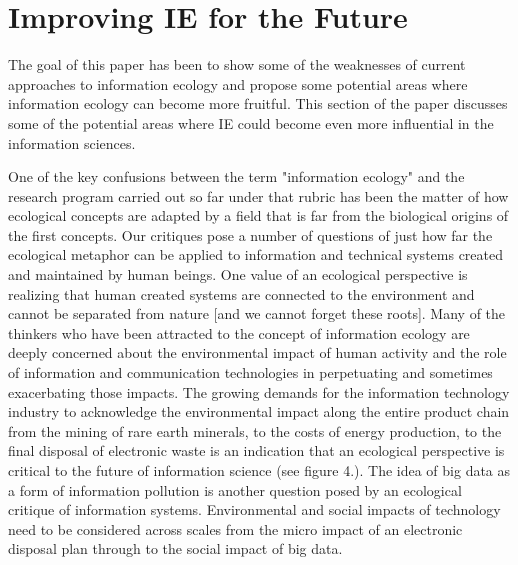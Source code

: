 \section{Improving IE for the Future}

The goal of this paper has been to show some of the weaknesses of current approaches to information ecology and propose some potential areas where information ecology can become more fruitful. This section of the paper discusses some of the potential areas where IE could become even more influential in the information sciences.

One of the key confusions between the term "information ecology" and the research program carried out so far under that rubric has been the matter of how ecological concepts are adapted by a field that is far from the biological origins of the first concepts. Our critiques pose a number of questions of just how far the ecological metaphor can be applied to information and technical systems created and maintained by human beings. One value of an ecological perspective is realizing that human created systems are connected to the environment and cannot be separated from nature [and we cannot forget these roots]. Many of the thinkers who have been attracted to the concept of information ecology are deeply concerned about the environmental impact of human activity and the role of information and communication technologies in perpetuating and sometimes exacerbating those impacts. The growing demands for the information technology industry to acknowledge the environmental impact along the entire product chain from the mining of rare earth minerals, to the costs of energy production, to the final disposal of electronic waste is an indication that an ecological perspective is critical to the future of information science (see figure 4.). The idea of big data as a form of information pollution is another question posed by an ecological critique of information systems. Environmental and social impacts of technology need to be considered across scales from the micro impact of an electronic disposal plan through to the social impact of big data.

